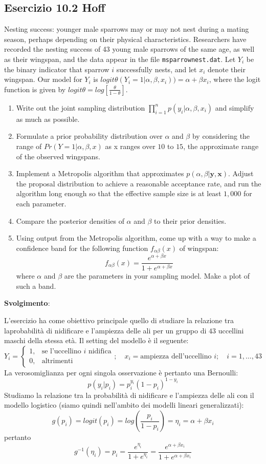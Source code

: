 \subsection*{Esercizio 10.2 Hoff} %

Nesting success: younger male sparrows may or may not nest during a mating season, perhaps depending on their physical characteristics. Researchers have recorded the nesting success of 43 young male sparrows of the same age, as well as their wingspan, and the data appear in the file \texttt{msparrownest.dat}. Let $Y_i$ be the binary indicator that sparrow $i$ successfully nests, and let $x_i$ denote their wingspan. Our model for $Y_i$ is $logit\theta(Y_i = 1|\alpha, \beta, x_i)) = \alpha + \beta x_i$, where the logit function is given by $logit \theta = log\left[\frac{\theta}{1-\theta}\right]$.
\begin{enumerate}
  \item Write out the joint sampling distribution  $\prod_{i=1}^{n}p(y_i | \alpha, \beta, x_i)$ and simplify as much as possible.
  \item Formulate a prior probability distribution over $\alpha$ and $\beta$ by considering the range of $Pr(Y = 1|\alpha,\beta,x)$ as x ranges over $10$ to $15$, the approximate range of the observed wingspans.
  \item Implement a Metropolis algorithm that approximates $p(\alpha, \beta|\mathbf{y}, \mathbf{x})$. Adjust the proposal distribution to achieve a reasonable acceptance rate, and run the algorithm long enough so that the effective sample size is at least $1,000$ for each parameter.
  \item Compare the posterior densities of $\alpha$ and $\beta$ to their prior densities.
  \item Using output from the Metropolis algorithm, come up with a way to make a confidence band for the following function $f_{\alpha\beta}(x)$ of wingspan:
  $$f_{\alpha\beta}(x) = \frac{e^{\alpha + \beta x}}{1+e^{\alpha + \beta x}}$$
  where $\alpha$ and $\beta$ are the parameters in your sampling model. Make a plot of such a band.
\end{enumerate}


\textbf{Svolgimento}:
\bigskip

L'esercizio ha come obiettivo principale quello di studiare la relazione tra laprobabilità di nidificare e l'ampiezza delle ali per un gruppo di $43$ uccellini maschi della stessa età. Il setting del modello è il seguente:
$$Y_i = \begin{cases} 1, & \mbox{se l'uccellino } i\mbox{ nidifica} \\ 0, & \mbox{altrimenti } \end{cases}; \quad x_i = \text{ampiezza dell'uccellino } i; \quad i = 1, \dots, 43$$
La verosomiglianza per ogni singola osservazione è pertanto una Bernoulli:
$$p(y_i | p_i) = p_i^{y_i}(1-p_i)^{1-y_i}$$
Studiamo la relazione tra la probabilità di nidificare e l'ampiezza delle ali con il modello logistico (siamo quindi nell'ambito dei modelli lineari generalizzati):
$$g(p_i) = logit(p_i) = log\left(\frac{p_i}{1-p_i}\right) = \eta_i = \alpha + \beta x_i$$
pertanto
$$g^{-1}(\eta_i) = p_i = \frac{e^{\eta_i}}{1+e^{\eta_i}} = \frac{e^{\alpha + \beta x_i}}{1+e^{\alpha + \beta x_i}}$$

